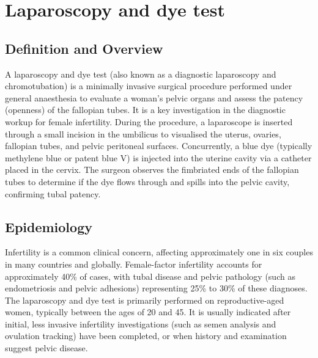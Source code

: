 \chapter{Laparoscopy and dye test}

\section*{Definition and Overview}
A laparoscopy and dye test (also known as a diagnostic laparoscopy and chromotubation) is a minimally invasive surgical procedure performed under general anaesthesia to evaluate a woman's pelvic organs and assess the patency (openness) of the fallopian tubes. It is a key investigation in the diagnostic workup for female infertility. During the procedure, a laparoscope is inserted through a small incision in the umbilicus to visualised the uterus, ovaries, fallopian tubes, and pelvic peritoneal surfaces. Concurrently, a blue dye (typically methylene blue or patent blue V) is injected into the uterine cavity via a catheter placed in the cervix. The surgeon observes the fimbriated ends of the fallopian tubes to determine if the dye flows through and spills into the pelvic cavity, confirming tubal patency.

\section*{Epidemiology}
Infertility is a common clinical concern, affecting approximately one in six couples in many countries and globally. Female-factor infertility accounts for approximately 40\% of cases, with tubal disease and pelvic pathology (such as endometriosis and pelvic adhesions) representing 25\% to 30\% of these diagnoses. The laparoscopy and dye test is primarily performed on reproductive-aged women, typically between the ages of 20 and 45. It is usually indicated after initial, less invasive infertility investigations (such as semen analysis and ovulation tracking) have been completed, or when history and examination suggest pelvic disease.

